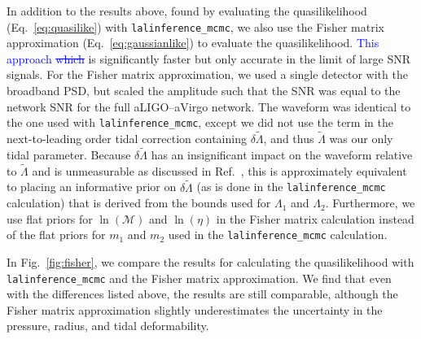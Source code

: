 \documentclass[twocolumn,prd,amssymb,aps,nofootinbib,showpacs,epsf]{revtex4}
\newcommand\les[2]{\textcolor{blue}{{#1}\sout{#2}}}
\begin{document}
In addition to the results above, found by evaluating the quasilikelihood (Eq.~\eqref{eq:quasilike}) with \texttt{lalinference\_mcmc}, we also use the Fisher matrix approximation (Eq.~\eqref{eq:gaussianlike}) to evaluate the quasilikelihood\les{.  This approach }{which} is significantly faster but only accurate in the limit of large SNR signals. For the Fisher matrix approximation, we used a single detector with the broadband PSD, but scaled the amplitude such that the SNR was equal to the network SNR for the full aLIGO--aVirgo network. The waveform was identical to the one used with \texttt{lalinference\_mcmc}, except we did not use the term in the next-to-leading order tidal correction containing $\delta\tilde\Lambda$, and thus $\tilde\Lambda$ was our only tidal parameter. Because $\delta\tilde\Lambda$ has an insignificant impact on the waveform relative to $\tilde\Lambda$ and is unmeasurable as discussed in Ref.~\cite{WadeCreightonOchsner2014}, this is approximately equivalent to placing an informative prior on $\delta\tilde\Lambda$ (as is done in the \texttt{lalinference\_mcmc} calculation) that is derived from the bounds used for $\Lambda_1$ and $\Lambda_2$. Furthermore, we use flat priors for $\ln(\mathcal{M})$ and $\ln(\eta)$ in the Fisher matrix calculation instead of the flat priors for $m_1$ and $m_2$ used in the \texttt{lalinference\_mcmc} calculation.

In Fig.~\ref{fig:fisher}, we compare the results for calculating the quasilikelihood with \texttt{lalinference\_mcmc} and the Fisher matrix approximation.  We find that even with the differences listed above, the results are still comparable, although the Fisher matrix approximation slightly underestimates the uncertainty in the pressure, radius, and tidal deformability.
\end{document}
